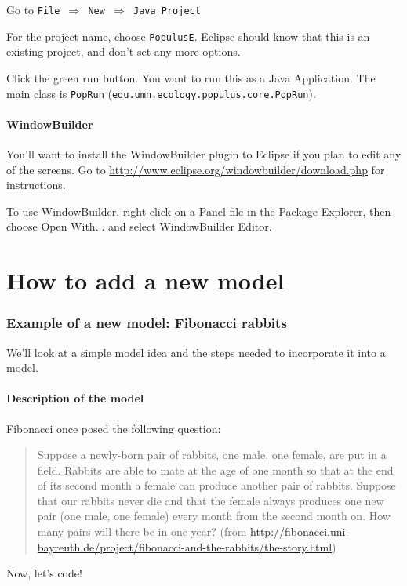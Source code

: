 \documentclass[12pt]{article}
\begin{document}
Go to \texttt{File $\Rightarrow$ New $\Rightarrow$ Java Project}


For the project name, choose \texttt{PopulusE}.  Eclipse should know that this is an existing project, and don't set any more options.

Click the green run button.  You want to run this as a Java Application.  The main class is \texttt{PopRun} (\texttt{edu.umn.ecology.populus.core.PopRun}).

\subsection{WindowBuilder}
You'll want to install the WindowBuilder plugin to Eclipse if you plan to edit any of the screens.  Go to \url{http://www.eclipse.org/windowbuilder/download.php} for instructions.

To use WindowBuilder, right click on a Panel file in the Package Explorer, then choose Open With... and select WindowBuilder Editor.

\part{How to add a new model}
\section{Example of a new model: Fibonacci rabbits}

We'll look at a simple model idea and the steps needed to incorporate it into a model.

\subsection{Description of the model}
Fibonacci once posed the following question:

\begin{quote}
Suppose a newly-born pair of rabbits, one male, one female, are put in a field. Rabbits are able to mate at the age of one month so that at the end of its second month a female can produce another pair of rabbits. Suppose that our rabbits never die and that the female always produces one new pair (one male, one female) every month from the second month on. How many pairs will there be in one year?  (from \url{http://fibonacci.uni-bayreuth.de/project/fibonacci-and-the-rabbits/the-story.html})
\end{quote}

Now, let's code!
\end{document}
